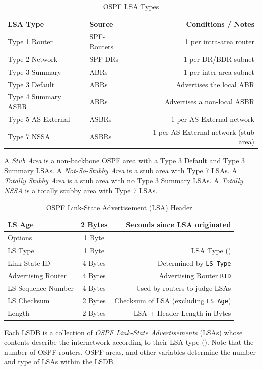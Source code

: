 \documentclass[12pt]{article}
\begin{document}
	\begin{table}[H]
	\centering
	\caption{OSPF LSA Types \label{tab:OSPF LSA TYPES}}
	\begin{tabular}{@{} l l r @{}}\hline
	\textbf{LSA Type}		& \textbf{Source}		& \textbf{Conditions / Notes}\\\hline
	Type 1 Router		& SPF-Routers		& 1 per intra-area router\\
	Type 2 Network		& SPF-DRs			& 1 per DR/BDR subnet\\
	Type 3 Summary		& ABRs			& 1 per inter-area subnet\\
	Type 3 Default		& ABRs			& Advertises the local ABR\\
	Type 4 Summary ASBR	& ABRs			& Advertises a non-local ASBR\\
	Type 5 AS-External	& ASBRs			& 1 per AS-External network\\
	Type 7 NSSA		& ASBRs			& 1 per AS-External network (stub area)\\\hline
	\end{tabular}\end{table}
	
	A \textit{Stub Area} is a non-backbone OSPF area with a Type 3 Default and Type 3 Summary LSAs. A \textit{Not-So-Stubby Area} is a stub area with Type 7 LSAs. A \textit{Totally Stubby Area} is a stub area with no Type 3 Summary LSAs. A \textit{Totally NSSA} is a totally stubby area with Type 7 LSAs.

	\begin{table}[H]
	\centering
	\caption{OSPF Link-State Advertisement (LSA) Header \label{tab:OSPF LSA}}
	\begin{tabular}{| l | c | r |}\hline
	LS Age			& 2 Bytes	& Seconds since LSA originated\\\hline
	Options			& 1 Byte	&\\\hline
	LS Type			& 1 Byte	& LSA Type (\Cref{tab:OSPF LSA TYPES})\\\hline
	Link-State ID		& 4 Bytes	& Determined by \texttt{LS Type}\\\hline
	Advertising Router	& 4 Bytes	& Advertising Router \texttt{RID}\\\hline
	LS Sequence Number	& 4 Bytes	& Used by routers to judge LSAs\\\hline
	LS Checksum		& 2 Bytes	& Checksum of LSA (excluding \texttt{LS Age})\\\hline
	Length			& 2 Bytes	& LSA + Header Length in Bytes\\\hline
	\end{tabular}\end{table}
	Each LSDB is a collection of \textit{OSPF Link-State Advertisements} (LSAs) whose contents describe the internetwork according to their LSA type (). Note that the number of OSPF routers, OSPF areas, and other variables determine the number and type of LSAs within the LSDB.
\end{document}
